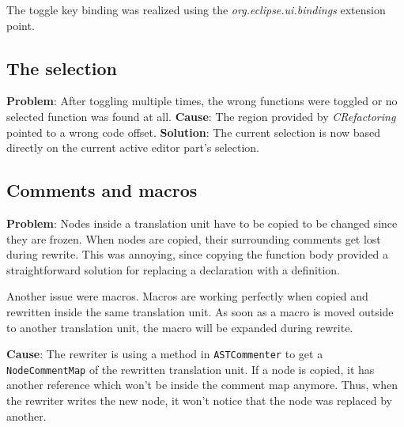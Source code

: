 The toggle key binding was realized using the \textit{org.eclipse.ui.bindings} 
extension point.

\subsection{The selection}
\textbf{Problem}: After toggling multiple times, the wrong functions were 
toggled or no selected function was found at all. 
\textbf{Cause}: The region provided by \textit{CRefactoring} pointed to a wrong 
code offset. 
\textbf{Solution}: The current selection is now based directly on the current 
active editor part's selection.

\subsection{Comments and macros}
\textbf{Problem}: Nodes inside a translation unit have to be copied to be 
changed since they are frozen. When nodes are copied, their surrounding comments 
get lost during rewrite\cite{Sommerlad:2008:RCR:1449814.1449817}. This was annoying, since copying the function body 
provided a straightforward solution for replacing a declaration with a 
definition.

Another issue were macros. Macros are working perfectly when copied and 
rewritten inside the same translation unit. As soon as a macro is moved outside 
to another translation unit, the macro will be expanded during rewrite. 

\textbf{Cause}: The rewriter is using a method in \texttt{ASTCommenter} to get a 
\texttt{NodeCommentMap} of the rewritten translation unit. If a node is copied, 
it has another reference which won't be inside the comment map anymore. Thus, 
when the rewriter writes the new node, it won't notice that the node was 
replaced by another.

